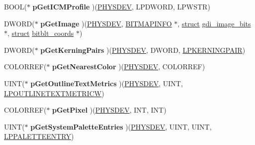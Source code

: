 \begin{DoxyCompactItemize}
\item 
\mbox{\label{structgdi__dc__funcs_a06b60621bd7cd8049d110bfe7f49c70a}} 
B\+O\+OL($\ast$ {\bfseries p\+Get\+I\+C\+M\+Profile} )(\hyperlink{structgdi__physdev}{P\+H\+Y\+S\+D\+EV}, L\+P\+D\+W\+O\+RD, L\+P\+W\+S\+TR)
\item 
\mbox{\label{structgdi__dc__funcs_a72926e28f7432f2b664666d1efcfcfcb}} 
D\+W\+O\+RD($\ast$ {\bfseries p\+Get\+Image} )(\hyperlink{structgdi__physdev}{P\+H\+Y\+S\+D\+EV}, \hyperlink{structtag_b_i_t_m_a_p_i_n_f_o}{B\+I\+T\+M\+A\+P\+I\+N\+FO} $\ast$, \hyperlink{interfacestruct}{struct} \hyperlink{structgdi__image__bits}{gdi\+\_\+image\+\_\+bits} $\ast$, \hyperlink{interfacestruct}{struct} \hyperlink{structbitblt__coords}{bitblt\+\_\+coords} $\ast$)
\item 
\mbox{\label{structgdi__dc__funcs_ae96f5a890128d10f7be0a3e7095acfd7}} 
D\+W\+O\+RD($\ast$ {\bfseries p\+Get\+Kerning\+Pairs} )(\hyperlink{structgdi__physdev}{P\+H\+Y\+S\+D\+EV}, D\+W\+O\+RD, \hyperlink{structtag_k_e_r_n_i_n_g_p_a_i_r}{L\+P\+K\+E\+R\+N\+I\+N\+G\+P\+A\+IR})
\item 
\mbox{\label{structgdi__dc__funcs_a1879e21cb833e41a79a06d82832665ba}} 
C\+O\+L\+O\+R\+R\+EF($\ast$ {\bfseries p\+Get\+Nearest\+Color} )(\hyperlink{structgdi__physdev}{P\+H\+Y\+S\+D\+EV}, C\+O\+L\+O\+R\+R\+EF)
\item 
\mbox{\label{structgdi__dc__funcs_a33c378b1bb1fe02c951a69331a7f82bc}} 
U\+I\+NT($\ast$ {\bfseries p\+Get\+Outline\+Text\+Metrics} )(\hyperlink{structgdi__physdev}{P\+H\+Y\+S\+D\+EV}, U\+I\+NT, \hyperlink{struct___o_u_t_l_i_n_e_t_e_x_t_m_e_t_r_i_c_w}{L\+P\+O\+U\+T\+L\+I\+N\+E\+T\+E\+X\+T\+M\+E\+T\+R\+I\+CW})
\item 
\mbox{\label{structgdi__dc__funcs_ac6b976304b42b98e709115c3c295b9a6}} 
C\+O\+L\+O\+R\+R\+EF($\ast$ {\bfseries p\+Get\+Pixel} )(\hyperlink{structgdi__physdev}{P\+H\+Y\+S\+D\+EV}, I\+NT, I\+NT)
\item 
\mbox{\label{structgdi__dc__funcs_a2ffc2f7b2495f9eeb38f694f66d73e55}} 
U\+I\+NT($\ast$ {\bfseries p\+Get\+System\+Palette\+Entries} )(\hyperlink{structgdi__physdev}{P\+H\+Y\+S\+D\+EV}, U\+I\+NT, U\+I\+NT, \hyperlink{structtag_p_a_l_e_t_t_e_e_n_t_r_y}{L\+P\+P\+A\+L\+E\+T\+T\+E\+E\+N\+T\+RY})

\end{DoxyCompactItemize}

